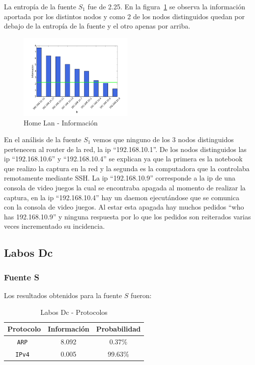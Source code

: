 \documentclass[final,inline,narroweqnarray,a4paper]{ieee}
\begin{document}
La entropía de la fuente $S_1$ fue de 2.25. En la figura~\ref{histo:homelanS1} se observa la información aportada por los distintos nodos y como 2 de los nodos distinguidos quedan por debajo de la entropía de la fuente y el otro apenas por arriba. 

\begin{figure}[H]
    \begin{center}
        \includegraphics[width=0.5\textwidth]{plot/homelanS1-bar.png}
        \caption{Home Lan - Información}
        \label{histo:homelanS1}
    \end{center}
\end{figure}

En el análisis de la fuente $S_1$ vemos que ninguno de los 3 nodos distinguidos pertenecen al router de la red, la ip ``192.168.10.1''. De los nodos distinguidos las ip ``192.168.10.6'' y ``192.168.10.4'' se explican ya que la primera es la notebook que realizo la captura en la red y la segunda es la computadora que la controlaba remotamente mediante SSH. La ip ``192.168.10.9'' corresponde a la ip de una consola de video juegos la cual se encontraba apagada al momento de realizar la captura, en la ip ``192.168.10.4'' hay un daemon ejecutándose que se comunica con la consola de video juegos. Al estar esta apagada hay muchos pedidos ``who has 192.168.10.9'' y ninguna respuesta por lo que los pedidos son reiterados varias veces incrementado su incidencia.

\subsection{Labos Dc}
\subsubsection{Fuente S}

Los resultados obtenidos para la fuente $S$ fueron:

\begin{table}[H]
    \begin{center}
        \begin{tabular}{|c|c|c|}
            \hline
            \textbf{Protocolo} & \textbf{Información} & \textbf{Probabilidad} \\ \hline
            \texttt{ARP       }& 8.092        & 0.37\%     \\ \hline
            \texttt{IPv4      }& 0.005        & 99.63\%    \\ \hline
        \end{tabular}
        \caption{Labos Dc - Protocolos}
        \label{table:labosDcS}
    \end{center}
\end{table} 
\end{document}
